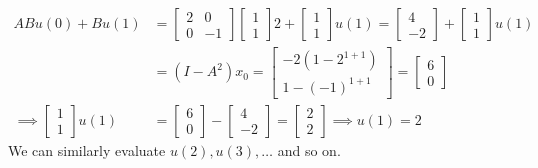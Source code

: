 \begin{align*}
    A B u(0) + B u(1)
     & =
    \left[\begin{array}{cc}
                  2 & 0  \\
                  0 & -1
              \end{array}\right]
    \left[\begin{array}{c}
                  1 \\
                  1
              \end{array}\right]
    2
    +
    \left[\begin{array}{c}
                  1 \\
                  1
              \end{array}\right]
    u(1)
    =
    \left[\begin{array}{c}
                  4 \\
                  -2
              \end{array}\right]
    +
    \left[\begin{array}{c}
                  1 \\
                  1
              \end{array}\right]
    u(1)
    \\ & =
    (I - A^2) x_0
    =
    \left[\begin{array}{c}
                  -2(1 - 2^{1 + 1}) \\
                  1 - (-1)^{1 + 1}
              \end{array}\right]
    =
    \left[\begin{array}{c}
                  6 \\
                  0
              \end{array}\right]
    \\
    \implies
    \left[\begin{array}{c}
                  1 \\
                  1
              \end{array}\right]
    u(1)
     & =
    \left[\begin{array}{c}
                  6 \\
                  0
              \end{array}\right]
    -
    \left[\begin{array}{c}
                  4 \\
                  -2
              \end{array}\right]
    =
    \left[\begin{array}{c}
                  2 \\
                  2
              \end{array}\right]
    \implies
    u(1)
    =
    2
\end{align*}
We can similarly evaluate \( u(2), u(3), \ldots \) and so on.

